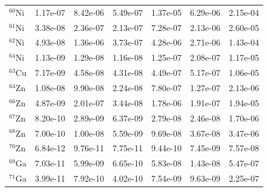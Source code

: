 \begin{table}
\begin{tabular}{l|cc|cc|cc}
$^{60}$Ni & 1.17e-07 & 8.42e-06 & 5.49e-07 & 1.37e-05 & 6.29e-06 & 2.15e-04\\
$^{61}$Ni & 3.38e-08 & 2.36e-07 & 2.13e-07 & 7.28e-07 & 2.13e-06 & 2.60e-05\\
$^{62}$Ni & 4.93e-08 & 1.36e-06 & 3.73e-07 & 4.28e-06 & 2.71e-06 & 1.43e-04\\
$^{64}$Ni & 1.13e-09 & 1.29e-08 & 1.16e-08 & 1.25e-07 & 2.08e-07 & 1.17e-05\\
$^{63}$Cu & 7.17e-09 & 4.58e-08 & 4.31e-08 & 4.49e-07 & 5.17e-07 & 1.06e-05\\
$^{64}$Zn & 1.08e-08 & 9.90e-08 & 2.24e-08 & 7.80e-07 & 1.27e-07 & 2.13e-06\\
$^{66}$Zn & 4.87e-09 & 2.01e-07 & 3.44e-08 & 1.78e-06 & 1.91e-07 & 1.94e-05\\
$^{67}$Zn & 8.20e-10 & 2.89e-09 & 6.37e-09 & 2.79e-08 & 2.46e-08 & 1.70e-06\\
$^{68}$Zn & 7.00e-10 & 1.00e-08 & 5.59e-09 & 9.69e-08 & 3.67e-08 & 3.47e-06\\
$^{70}$Zn & 6.84e-12 & 9.76e-11 & 7.75e-11 & 9.44e-10 & 7.45e-09 & 7.57e-08\\
$^{69}$Ga & 7.03e-11 & 5.99e-09 & 6.65e-10 & 5.83e-08 & 1.43e-08 & 5.47e-07\\
$^{71}$Ga & 3.99e-11 & 7.92e-10 & 4.02e-10 & 7.54e-09 & 9.63e-09 & 2.25e-07\\
\hline
\end{tabular}
\end{table}
\newpage


